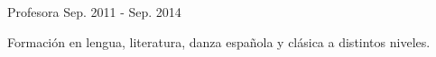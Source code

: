 

\begin{cventries}

  \cventry
    {Profesora} %
    {} %
    {} %
    {Sep. 2011 - Sep. 2014} %
    {
      \begin{cvitems} %
        \item {Formación en lengua, literatura, danza española y clásica a distintos niveles.}
      \end{cvitems}
    }

\end{cventries}
